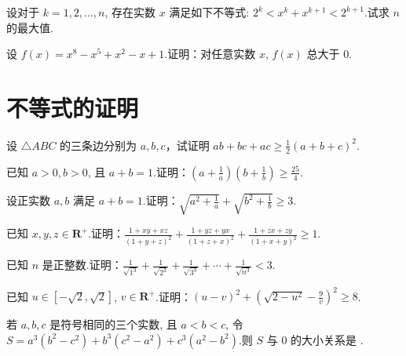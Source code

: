 \documentclass[a4paper , final]{ctexart}
\newenvironment{problem}[1]{%
  \item #1
  \par
  \vspace{8cm}
}{}
\begin{document}
\begin{problems}
  \begin{problem}
  {
  设对于 $k=1, 2, \dots, n$, 存在实数 $x$ 满足如下不等式: $2^k < x^k + x^{k+1} < 2^{k+1}$.试求 $n$ 的最大值.
  }
  \end{problem}

  \begin{problem}
  {
  设 $f(x) = x^8 - x^5 + x^2 - x + 1$.证明：对任意实数 $x$, $f(x)$ 总大于 $0$.
  }
  \end{problem}

\end{problems}

\section*{不等式的证明}

\begin{problems}
  \begin{problem}
  {
  设 $\triangle ABC$ 的三条边分别为 $a,b,c$，试证明 $ab+bc+ac\ge \frac{1}{2}(a+b+c)^2$.
  }
  \end{problem}

  \begin{problem}
  {
  已知 $a > 0, b > 0$, 且 $a+b=1$.证明：$\left(a + \frac{1}{a}\right)\left(b + \frac{1}{b}\right) \ge \frac{25}{4}$.
  }
  \end{problem}

  \begin{problem}
  {
  设正实数 $a, b$ 满足 $a+b=1$.证明：$\sqrt{a^2 + \frac{1}{a}} + \sqrt{b^2 + \frac{1}{b}} \ge 3$.
  }
  \end{problem}

  \begin{problem}
  {
  已知 $x, y, z \in \mathbf{R}^+$.证明：$\frac{1+xy+xz}{(1+y+z)^2} + \frac{1+yz+yx}{(1+z+x)^2} + \frac{1+zx+zy}{(1+x+y)^2} \geq 1$.
  }
  \end{problem}

  \begin{problem}
  {
  已知 $n$ 是正整数.证明：$\frac{1}{\sqrt{1^3}} + \frac{1}{\sqrt{2^3}} + \frac{1}{\sqrt{3^3}} + \cdots + \frac{1}{\sqrt{n^3}} < 3$.
  }
  \end{problem}

  \begin{problem}
  {
  已知 $u \in [-\sqrt{2}, \sqrt{2}]$, $v \in \mathbf{R}^+$.证明：$(u-v)^2 + \left(\sqrt{2-u^2} - \frac{9}{v}\right)^2 \ge 8$.
  }
  \end{problem}

  \begin{problem}
  {
  若 $a,b,c$ 是符号相同的三个实数, 且 $a < b < c$, 令 $S = a^3(b^2-c^2) + b^3(c^2-a^2) + c^3(a^2-b^2)$.则 $S$ 与 $0$ 的大小关系是 \underline{\hspace{3cm}}.
  }
  \end{problem}


\end{problems}
\end{document}
